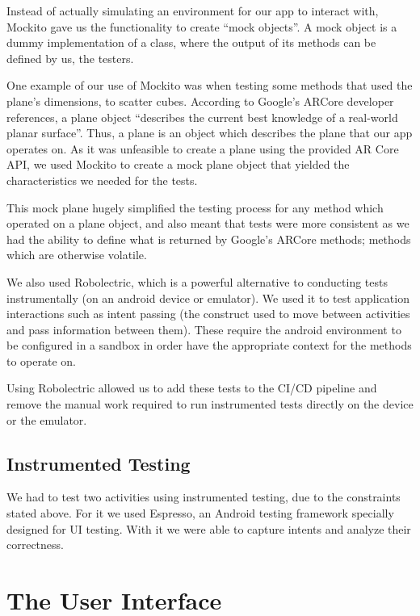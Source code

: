 \documentclass{l3proj}
\begin{document}
Instead of actually simulating an environment for our app to interact with, Mockito 
gave us the functionality to create “mock objects”. A mock object is a dummy 
implementation of a class, where the output of its methods can be defined by us, 
the testers.

One example of our use of Mockito was when testing some methods that used the plane's dimensions,
to scatter cubes. According to Google's ARCore developer references, a plane object “describes the 
current best knowledge of a real-world planar surface”\cite{Plane}. Thus, a plane is an object 
which describes the plane that our app operates on. As it was unfeasible to create a plane
using the provided AR Core API, we used Mockito to create a mock plane object
that yielded the characteristics we needed for the tests\cite{MockitoRerence}.

This mock plane hugely simplified the testing process for any method which 
operated on a plane object, and also meant that tests were more consistent as 
we had the ability to define what is returned by Google's ARCore methods; methods 
which are otherwise volatile.

We also used Robolectric, which is a powerful alternative to conducting tests instrumentally (on 
an android device or emulator)\cite{Roboelectric}. We used it to test application interactions
such as intent passing (the construct used to move between activities and pass 
information between them). These require the android environment to be configured in
a sandbox in order have the appropriate context for the methods to operate on.

Using Robolectric allowed us to add these tests to the CI/CD pipeline and remove
the manual work required to run instrumented tests directly on the device or the
emulator.

\subsection{Instrumented Testing}

We had to test two activities using instrumented testing, due to the constraints
stated above. For it we used Espresso, an Android testing framework specially 
designed for UI testing. With it we were able to capture intents and analyze their
correctness\cite{Espresso}.


\section{The User Interface}
\end{document}
